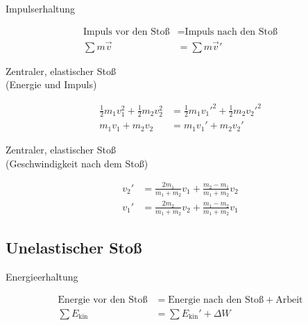 \begin{boxleft}Impulserhaltung
\end{boxleft}\begin{boxrightshaded}
\begin{align}
\text{Impuls vor den Stoß} &= \text{Impuls nach den Stoß}\nonumber\\
\sum m\vec{v}&= \sum m\vec{v}'
\end{align}
\end{boxrightshaded}

\begin{boxleft}Zentraler, elastischer Stoß\\
(Energie und Impuls)
\end{boxleft}\begin{boxrightshaded}
\begin{align}
\frac{1}{2}m_1v_1^2+\frac{1}{2}m_2v_2^2&=\frac{1}{2}m_1v_1'^2+\frac{1}{2}m_2v_2'^2\\
m_1v_1+m_2v_2&=m_1v_1'+m_2v_2'
\end{align}
\end{boxrightshaded}

\begin{boxleft}Zentraler, elastischer Stoß\\
(Geschwindigkeit nach dem Stoß)
\end{boxleft}\begin{boxrightshaded}
\begin{align}
v_2'&=\frac{2m_1}{m_1+m_2}v_1+\frac{m_2-m_1}{m_1+m_2}v_2\\
v_1'&=\frac{2m_2}{m_1+m_2}v_2+\frac{m_1-m_2}{m_1+m_2}v_1
\end{align}
\end{boxrightshaded}

\subsection{Unelastischer Stoß}

\begin{boxleft}Energieerhaltung
\end{boxleft}\begin{boxrightshaded}
\begin{align}
\text{Energie vor den Stoß} &= \text{Energie nach den Stoß}+\text{Arbeit}\nonumber\\
\sum E_{\text{kin}}&=\sum E_{\text{kin}}'+\Delta W
\end{align}
\end{boxrightshaded}

